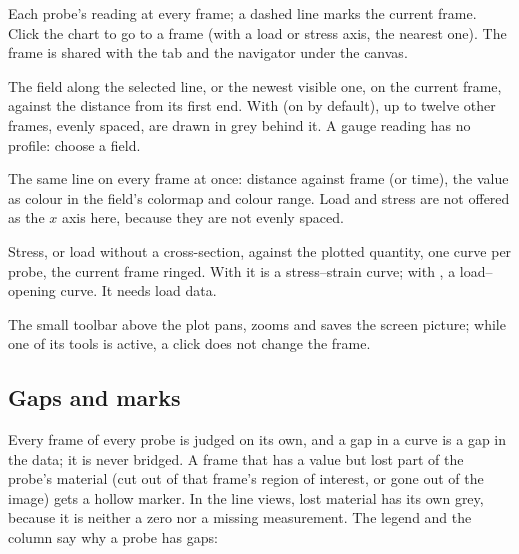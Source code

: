 \begin{description}[leftmargin=0.6cm,style=nextline]
  \item[Over time]
    Each probe's reading at every frame; a dashed line marks the current frame. Click the chart to
    go to a frame (with a load or stress axis, the nearest one). The frame is shared with the
     tab and the navigator under the canvas.
  \item[Along the line]
    The field along the selected line, or the newest visible one, on the current frame, against the
    distance from its first end. With  (on by default), up to twelve other frames,
    evenly spaced, are drawn in grey behind it. A gauge reading has no profile: choose a field.
  \item[Kymograph]
    The same line on every frame at once: distance against frame (or time), the value as colour in
    the field's colormap and colour range. Load and stress are not offered as the $x$ axis here,
    because they are not evenly spaced.
  \item[Stress–strain]
    Stress, or load without a cross-section, against the plotted quantity, one curve per probe, the
    current frame ringed. With  it is a stress--strain curve; with
    , a load--opening curve. It needs load data.
\end{description}

The small toolbar above the plot pans, zooms and saves the screen picture; while one of its tools
is active, a click does not change the frame.

\subsection{Gaps and marks}

Every frame of every probe is judged on its own, and a gap in a curve is a gap in the data; it is
never bridged. A frame that has a value but lost part of the probe's material (cut out of that
frame's region of interest, or gone out of the image) gets a hollow marker. In the line views,
lost material has its own grey, because it is neither a zero nor a missing measurement. The
legend and the  column say why a probe has gaps:

